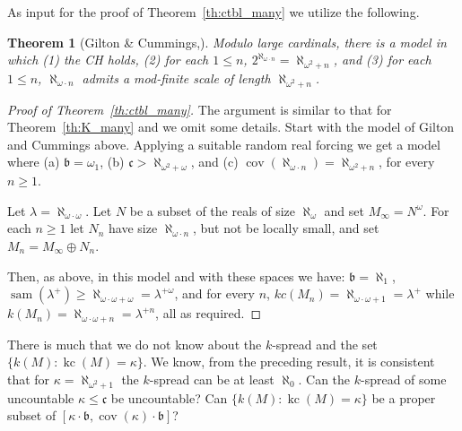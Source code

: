 \documentclass{article}
\newtheorem{thm}{Theorem}[section]
\begin{document}
As input for the proof of   Theorem~\ref{th:ctbl_many} we utilize the following.
\begin{thm}[Gilton \& Cummings,\cite{GiltonCummings}] Modulo large cardinals, there is a model in which (1) the \textsc{CH} holds, 
    (2) for each $1\leq n$, $2^{\aleph_{\omega\cdot n}}=\aleph_{\omega^2 +n}$, and
    (3) for each $1\leq n$, 
    $\aleph_{\omega\cdot n}$ admits a mod-finite scale of length $\aleph_{\omega^2+n}$.
\end{thm}


\begin{proof}[Proof of  Theorem~\ref{th:ctbl_many}]
The argument is similar to that for Theorem~\ref{th:K_many} and we omit some details. Start with the model of Gilton and Cummings above. Applying a suitable random real forcing we get a model where (a) $\mathfrak{b}=\omega_1$, (b) $\mathfrak{c}>\aleph_{\omega^2+\omega}$, 
and
(c) $\mathop{cov}(\aleph_{\omega\cdot n})=\aleph_{\omega^2+n}$, for every $n \ge 1$.

Let $\lambda=\aleph_{\omega\cdot \omega}$. 
Let $N$ be a subset of the reals of size $\aleph_\omega$ and set $M_\infty=N^\omega$. For each $n \ge 1$ let $N_n$ have size $\aleph_{\omega\cdot n}$, but not be locally small, and set $M_n = M_\infty \oplus N_n$. 



Then, as above, in this model and with these spaces we have: $\mathfrak{b}=\aleph_1$, $\mathop{sam}(\lambda^+)\ge\aleph_{\omega\cdot\omega+\omega}=\lambda^{+\omega}$, and for every $n$, $kc(M_n)=\aleph_{\omega\cdot\omega+1}=\lambda^+$ while $k(M_n)=\aleph_{\omega\cdot\omega+n}=\lambda^{+n}$, all as required. 
\end{proof}


   
   
There is much that we do not know about the $k$-spread and the set $\{k(M) : \mathop{kc}(M)=\kappa\}$. 
We know, from the preceding result, it is consistent  that for $\kappa=\aleph_{\omega^2+1}$ the $k$-spread can be at least $\aleph_0$. 
Can the $k$-spread of some uncountable $\kappa \le \mathfrak{c}$ be uncountable? 
Can $\{k(M) : \mathop{kc}(M)=\kappa\}$  be a proper subset of $[\kappa\cdot\mathfrak{b},\mathop{cov}(\kappa)\cdot\mathfrak{b}]$? 






\end{document}
